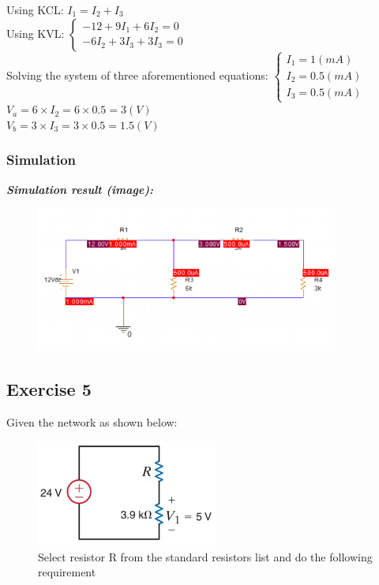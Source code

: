 Using KCL: $I_1 = I_2 + I_3$\\
Using KVL:
$\begin{cases}
        -12 + 9I_1 + 6I_2 = 0 \\
        -6I_2 + 3I_3 + 3I_3 = 0
    \end{cases}$ \\
Solving the system of three aforementioned equations:
$\begin{cases}
        I_1 = 1 (mA)  \\
        I_2 = 0.5(mA) \\
        I_3 = 0.5(mA)
    \end{cases}$
\\
$V_a = 6 \times I_2 = 6 \times 0.5 = 3 (V)$ \\
$V_b = 3 \times I_3 = 3 \times 0.5 = 1.5(V)$ \\


\subsubsection{Simulation}
\textit{\textbf{Simulation result (image):}}
\begin{figure}[H]
    \centering
    \includegraphics[width = 10cm]{source/picture/bai_1/ex4_sim.png}
\end{figure}
\newpage

\subsection{Exercise 5}
Given the network as shown below:

\begin{figure}[H]
    \centering
    \includegraphics[width = 6cm]{source/picture/bai_1/lab1_ex5_de.png}
    \caption{Select resistor R from the standard resistors list and do the following requirement}
    \label{lab1_ex5_de}
\end{figure}

